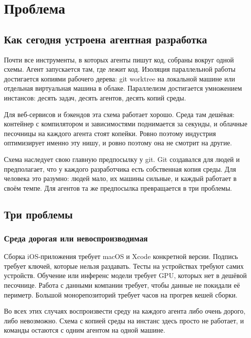 \chapter{Проблема}

\section{Как сегодня устроена агентная разработка}

Почти все инструменты, в которых агенты пишут код, собраны вокруг одной схемы. Агент запускается там, где лежит код. Изоляция параллельной работы достигается копиями рабочего дерева: git worktree на локальной машине или отдельная виртуальная машина в облаке. Параллелизм достигается умножением инстансов: десять задач, десять агентов, десять копий среды.

Для веб-сервисов и бэкендов эта схема работает хорошо. Среда там дешёвая: контейнер с компилятором и зависимостями поднимается за секунды, и облачные песочницы на каждого агента стоят копейки. Ровно поэтому индустрия оптимизирует именно эту нишу, и ровно поэтому она не смотрит на другие.

Схема наследует свою главную предпосылку у git. Git создавался для людей и предполагает, что у каждого разработчика есть собственная копия среды. Для человека это разумно: людей мало, их машины сильные, и каждый работает в своём темпе. Для агентов та же предпосылка превращается в три проблемы.

\section{Три проблемы}

\subsection{Среда дорогая или невоспроизводимая}

Сборка iOS-приложения требует macOS и Xcode конкретной версии. Подпись требует ключей, которые нельзя раздавать. Тесты на устройствах требуют самих устройств. Обучение или инференс модели требует GPU, которых нет в дешёвой песочнице. Работа с данными компании требует, чтобы данные не покидали её периметр. Большой монорепозиторий требует часов на прогрев кешей сборки.

Во всех этих случаях воспроизвести среду на каждого агента либо очень дорого, либо невозможно. Схема с копией среды на инстанс здесь просто не работает, и команды остаются с одним агентом на одной машине.


